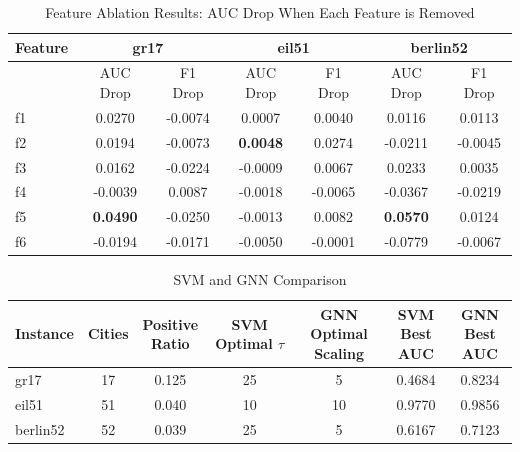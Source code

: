 \documentclass[twoside]{article}
\begin{document}
	

	\begin{table}[htbp]
		\centering
		\caption{Feature Ablation Results: AUC Drop When Each Feature is Removed}
		\label{tab:feature_ablation_compact}
		\begin{tabular}{l|cc|cc|cc} \hline
		Feature & \multicolumn{2}{c}{gr17} & \multicolumn{2}{c}{eil51} & \multicolumn{2}{c}{berlin52} \\ \hline
			& {AUC Drop} & {F1 Drop} & {AUC Drop} & {F1 Drop} & {AUC Drop} & {F1 Drop} \\ \hline
			f1 & 0.0270 & -0.0074 & 0.0007 & 0.0040 & 0.0116 & 0.0113 \\
			f2 & 0.0194 & -0.0073 & \textbf{0.0048} & 0.0274 & -0.0211 & -0.0045 \\
			f3 & 0.0162 & -0.0224 & -0.0009 & 0.0067 & 0.0233 & 0.0035 \\
			f4 & -0.0039 & 0.0087 & -0.0018 & -0.0065 & -0.0367 & -0.0219 \\
			f5 & \textbf{0.0490} & -0.0250 & -0.0013 & 0.0082 & \textbf{0.0570} & 0.0124 \\
			f6 & -0.0194 & -0.0171 & -0.0050 & -0.0001 & -0.0779 & -0.0067 \\ \hline
			\end{tabular}
	\end{table}

	

	

	

	\begin{table}[htbp]
		\centering
		\caption{SVM and GNN Comparison}
		\label{tab:svm_vs_gnn_comparison}
		\begin{tabular}{l|cccccc}\hline
			Instance & Cities & \makecell{Positive \\ Ratio} & \makecell{SVM \\ Optimal $\tau$} & \makecell{GNN \\ Optimal Scaling} & \makecell{SVM \\ Best AUC} & \makecell{GNN \\ Best AUC} \\ \hline
			gr17     & 17  & 0.125 & 25 & 5  & 0.4684 & 0.8234 \\
			eil51    & 51  & 0.040 & 10 & 10 & 0.9770 & 0.9856 \\
			berlin52 & 52  & 0.039 & 25 & 5  & 0.6167 & 0.7123 \\ \hline
		\end{tabular}
	\end{table}
\end{document}
